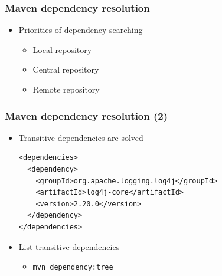 \documentclass[10pt,xcolor=pdflatex]{beamer}
\begin{document}
\begin{frame}[containsverbatim]\frametitle{Maven dependency resolution}
\begin{itemize}
	\item Priorities of dependency searching
	  \begin{itemize}
		\item Local repository
		\item Central repository
		\item Remote repository
	  \end{itemize}
\end{itemize}
\end{frame}


\begin{frame}[containsverbatim]\frametitle{Maven dependency resolution (2)}
\begin{itemize}
    \item Transitive dependencies are solved
    \begin{footnotesize}
    \begin{verbatim}
<dependencies>	
  <dependency>
    <groupId>org.apache.logging.log4j</groupId>
    <artifactId>log4j-core</artifactId>
    <version>2.20.0</version>
  </dependency>
</dependencies>	
    \end{verbatim}       
    \end{footnotesize}
    \item List transitive dependencies
      \begin{itemize}
    	\item \texttt{mvn dependency:tree}
      \end{itemize}
\end{itemize}
\end{frame}
\end{document}
